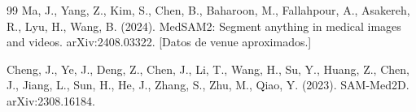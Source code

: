 \begin{thebibliography}{99}
Ma, J., Yang, Z., Kim, S., Chen, B., Baharoon, M., Fallahpour, A., Asakereh, R., Lyu, H., Wang, B. (2024). MedSAM2: Segment anything in medical images and videos. arXiv:2408.03322. [Datos de venue aproximados.]

Cheng, J., Ye, J., Deng, Z., Chen, J., Li, T., Wang, H., Su, Y., Huang, Z., Chen, J., Jiang, L., Sun, H., He, J., Zhang, S., Zhu, M., Qiao, Y. (2023). SAM-Med2D. arXiv:2308.16184.

\end{thebibliography}

